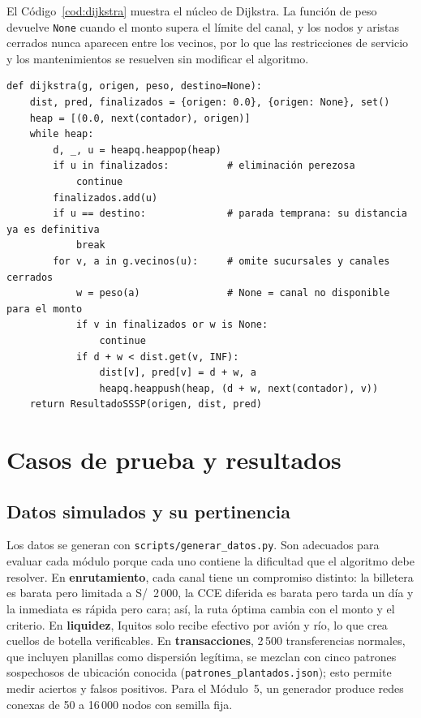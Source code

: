 \documentclass[11pt,a4paper]{article}
\newcommand{\id}[1]{\texttt{#1}}
\begin{document}
El Código~\ref{cod:dijkstra} muestra el núcleo de Dijkstra. La función de peso devuelve \id{None} cuando el monto
supera el límite del canal, y los nodos y aristas cerrados nunca aparecen entre los vecinos, por lo que las
restricciones de servicio y los mantenimientos se resuelven sin modificar el algoritmo.

\begin{lstlisting}[float=htb,caption={Núcleo de Dijkstra con montículo binario (\texttt{src/algoritmos/caminos\_minimos.py})},label=cod:dijkstra]
def dijkstra(g, origen, peso, destino=None):
    dist, pred, finalizados = {origen: 0.0}, {origen: None}, set()
    heap = [(0.0, next(contador), origen)]
    while heap:
        d, _, u = heapq.heappop(heap)
        if u in finalizados:          # eliminación perezosa
            continue
        finalizados.add(u)
        if u == destino:              # parada temprana: su distancia ya es definitiva
            break
        for v, a in g.vecinos(u):     # omite sucursales y canales cerrados
            w = peso(a)               # None = canal no disponible para el monto
            if v in finalizados or w is None:
                continue
            if d + w < dist.get(v, INF):
                dist[v], pred[v] = d + w, a
                heapq.heappush(heap, (d + w, next(contador), v))
    return ResultadoSSSP(origen, dist, pred)
\end{lstlisting}

\section{Casos de prueba y resultados}

\subsection{Datos simulados y su pertinencia}
Los datos se generan con \id{scripts/generar\_datos.py}. Son adecuados para evaluar cada módulo porque cada uno
contiene la dificultad que el algoritmo debe resolver. En \textbf{enrutamiento}, cada canal tiene un compromiso
distinto: la billetera es barata pero limitada a S/~2\,000, la CCE diferida es barata pero tarda un día y la
inmediata es rápida pero cara; así, la ruta óptima cambia con el monto y el criterio. En \textbf{liquidez}, Iquitos
solo recibe efectivo por avión y río, lo que crea cuellos de botella verificables. En \textbf{transacciones}, 2\,500
transferencias normales, que incluyen planillas como dispersión legítima, se mezclan con cinco patrones sospechosos
de ubicación conocida (\id{patrones\_plantados.json}); esto permite medir aciertos y falsos positivos. Para el Módulo~5,
un generador produce redes conexas de 50 a 16\,000 nodos con semilla fija.
\end{document}
